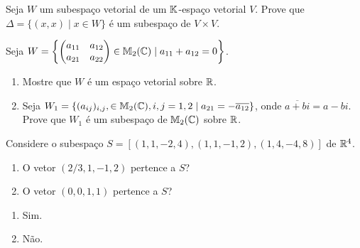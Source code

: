 \documentclass[12pt]{exam}
\begin{document}
\begin{exercicio}
    Seja $W$ um subespaço vetorial de um $\mathbb{K}$-espaço vetorial $V$. Prove que $\Delta = \{(x, x) \mid x \in W\}$ é um subespaço de $V \times V$.
\end{exercicio}

\begin{exercicio}
	Seja $W = \left\{\begin{pmatrix} a_{11} & a_{12}\\ a_{21} & a_{22}\end{pmatrix} \in \mathbb{M}_2(\mathbb{C}) \mid a_{11} + a_{12} = 0\right\}$.
	\begin{enumerate}[label={\alph*})]
		\item Mostre que $W$ \'e um espa\c{c}o vetorial sobre $\mathbb{R}$.

		\item Seja $W_1 = \{(a_{ij})_{i,j}, \in \mathbb{M}_2(\mathbb{C}), i, j = 1, 2 \mid a_{21} = -\overline{a_{12}}\}$, onde $\overline{a + bi} = a - bi$. Prove que $W_1$ \'e um subespa\c{c}o de $\mathbb{M}_2(\mathbb{C})$ sobre $\mathbb{R}$.
	\end{enumerate}
\end{exercicio}

\begin{exercicio}
	Considere o subespa\c{c}o $S = [(1,1,-2,4),(1,1,-1,2),(1,4,-4,8)]$ de $\mathbb{R}^4$.
	\begin{enumerate}[label={\alph*})]
		\item O vetor $(2/3, 1, -1, 2)$ pertence a $S$?
		\item O vetor $(0, 0, 1, 1)$ pertence a $S$?
	\end{enumerate}
	\begin{solucao}
		\begin{enumerate}[label={\alph*})]
			\item Sim.
			\item N\~ao.
		\end{enumerate}
	\end{solucao}
\end{exercicio}
\end{document}
